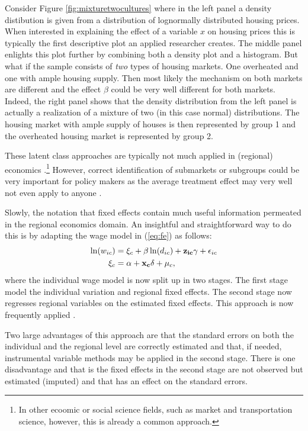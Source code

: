 \documentclass[fleqn,10pt]{SelfArx} %
\begin{document}
Consider Figure \ref{fig:mixturetwocultures} where in the left panel a density
distibution is given from a distribution of lognormally distributed housing
prices. When interested in explaining the effect of a variable $x$ on housing prices
this is typically the first descriptive plot an applied researcher creates. The
middle panel enlights this plot further by combining both a density plot and a
histogram. But what if the sample consists of \emph{two} types of housing
markets. One overheated and one with ample housing supply. Then most likely the
mechanism on both markets are different and the effect $\beta$ could be very
well different for both markets. Indeed, the right panel shows that the density
distribution from the left panel is actually a realization of a mixture of two
(in this case normal) distributions. The housing market with ample supply of
houses is then represented by group 1 and the overheated housing market is
represented by group 2.

These latent class approaches are typically not much applied in (regional)
economics \citep[see for an exception, e.g.,]{lankhuizen2015}.\footnote{In other
ecoomic or social science fields, such as market and transportation science,
however, this is already a common approach.} However, correct identification of
submarkets or subgroups could be very important for policy makers as the average
treatment effect may very well not even apply to anyone \citep[an argument, in
Dutch, made as well in][]{DeGraaff2014misc}.  

Slowly, the notation that fixed effects contain much useful information
permeated in the regional economics domain. An insightful and straightforward
way to do this is by adapting the wage model in (\ref{eq:fe}) as follows:
\begin{align}
  \label{eq:fe2}
  \ln(w_{ic}) &= \xi_c + \beta \ln(d_{ic})+\mathbf{z_{ic}}\gamma + \epsilon_{ic} \notag \\
  \xi_c&=\alpha + \mathbf{x_c}\delta + \mu_c,
\end{align}
where the individual wage model is now split up in two stages. The first stage
model the individual variation and regional fixed effects. The second stage now
regresses regional variables on the estimated fixed effects. This approach is
now frequently applied \citep[For example, in the so-called sorting
model][]{Bayer2004, Bayer2007a, Wang2016,
  Bernasco2016}. 

Two large advantages of this approach are that the standard errors on both the
individual and the regional level are correctly estimated and that, if needed,
instrumental variable methods may be applied in the second stage. There is one
disadvantage and that is the fixed effects in the second stage are not observed
but estimated (imputed) and that has an effect on the standard errors.
\end{document}
